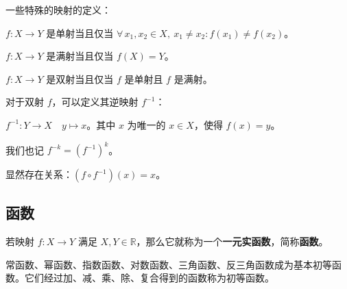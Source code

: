 一些特殊的映射的定义：

\begin{definition}[单射]
	$f: X \rightarrow Y$ 是单射当且仅当 $\forall\, x_1, x_2 \in X,\ x_1 \neq x_2: f(x_1) \neq f(x_2)$。
\end{definition}

\begin{definition}[满射]
	$f: X \rightarrow Y$ 是满射当且仅当 $f(X) = Y$。
\end{definition}

\begin{definition}[双射]
	$f: X \rightarrow Y$ 是双射当且仅当 $f$ 是单射且 $f$ 是满射。
\end{definition}

对于双射 $f$，可以定义其逆映射 $f^{-1}$：

\begin{definition}[逆映射]
	$f^{-1}: Y \rightarrow X \quad y \mapsto x$。其中 $x$ 为唯一的 $x \in X$，使得 $f(x) = y$。

	我们也记 $f^{-k} = (f^{-1})^k$。
\end{definition}

显然存在关系：$(f \circ f^{-1})(x) = x$。

\subsection{函数}

若映射 $f: X \rightarrow Y$ 满足 $X,Y \in \mathbb{R}$，那么它就称为一个\textbf{一元实函数}，简称\textbf{函数}。

常函数、幂函数、指数函数、对数函数、三角函数、反三角函数成为基本初等函数。它们经过加、减、乘、除、复合得到的函数称为初等函数。
